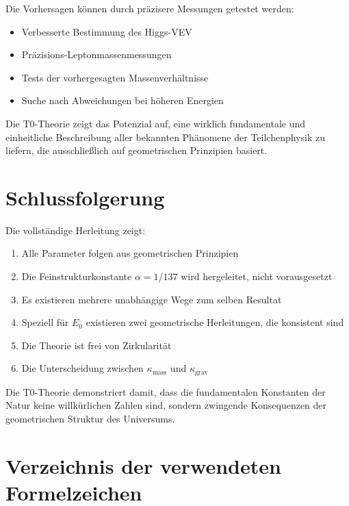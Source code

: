 \documentclass[12pt,a4paper]{article}
\theoremstyle{definition}
\begin{document}
Die Vorhersagen k{\"o}nnen durch pr{\"a}zisere Messungen getestet werden:

\begin{itemize}
	\item Verbesserte Bestimmung des Higgs-VEV
	\item Pr{\"a}zisions-Leptonmassenmessungen
	\item Tests der vorhergesagten Massenverh{\"a}ltnisse
	\item Suche nach Abweichungen bei h{\"o}heren Energien
\end{itemize}

Die T0-Theorie zeigt das Potenzial auf, eine wirklich fundamentale und einheitliche Beschreibung aller bekannten Ph{\"a}nomene der Teilchenphysik zu liefern, die ausschlie{\ss}lich auf geometrischen Prinzipien basiert.

	\section{Schlussfolgerung}
	
	Die vollst\"andige Herleitung zeigt:
	\begin{enumerate}
		\item Alle Parameter folgen aus geometrischen Prinzipien
		\item Die Feinstrukturkonstante $\alpha = 1/137$ wird hergeleitet, nicht vorausgesetzt
		\item Es existieren mehrere unabh\"angige Wege zum selben Resultat
		\item Speziell f\"ur $E_0$ existieren zwei geometrische Herleitungen, die konsistent sind
		\item Die Theorie ist frei von Zirkularit\"at
		\item Die Unterscheidung zwischen $\kappa_{\text{mass}}$ und $\kappa_{\text{grav}}$
	\end{enumerate}
	
	Die T0-Theorie demonstriert damit, dass die fundamentalen Konstanten der Natur keine willk\"urlichen Zahlen sind, sondern zwingende Konsequenzen der geometrischen Struktur des Universums.

\appendix
\section{Verzeichnis der verwendeten Formelzeichen}
\label{app:symbols_de}
\end{document}
